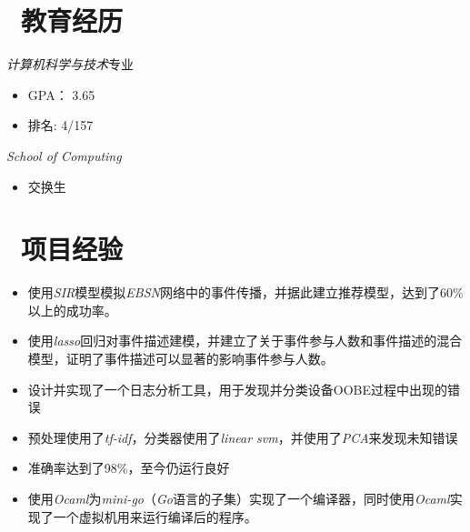 \documentclass{resume}
\begin{document}
\pagestyle{plain}

 
\section{\faGraduationCap\ 教育经历}
\textit{计算机科学与技术}专业
\begin{itemize}
  \item GPA： 3.65
  \item 排名: 4/157
\end{itemize}
\textit{School of Computing}
\begin{itemize}
  \item 交换生
\end{itemize}

\section{\faUsers\ 项目经验}
\begin{itemize}
  \item 使用\textit{SIR}模型模拟\textit{EBSN}网络中的事件传播，并据此建立推荐模型，达到了60\%以上的成功率。
  \item 使用\textit{lasso}回归对事件描述建模，并建立了关于事件参与人数和事件描述的混合模型，证明了事件描述可以显著的影响事件参与人数。
\end{itemize}

\begin{itemize}
  \item 设计并实现了一个日志分析工具，用于发现并分类设备OOBE过程中出现的错误
  \item 预处理使用了\textit{tf-idf}，分类器使用了\textit{linear svm}，并使用了\textit{PCA}来发现未知错误
  \item 准确率达到了98\%，至今仍运行良好
\end{itemize}

\begin{itemize}
  \item 使用\textit{Ocaml}为\textit{mini-go}（\textit{Go}语言的子集）实现了一个编译器，同时使用\textit{Ocaml}实现了一个虚拟机用来运行编译后的程序。
\end{itemize}
\end{document}
